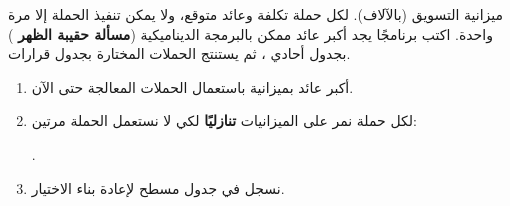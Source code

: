\begin{statement}
ميزانية التسويق  (بالآلاف). لكل حملة تكلفة وعائد متوقع، ولا يمكن تنفيذ الحملة إلا مرة واحدة. اكتب برنامجًا يجد أكبر عائد ممكن بالبرمجة الديناميكية (\textbf{مسألة حقيبة الظهر }) بجدول أحادي ، ثم يستنتج الحملات المختارة بجدول قرارات.
\end{statement}
\begin{stepsbox}\begin{enumerate}
\item {} أكبر عائد بميزانية  باستعمال الحملات المعالجة حتى الآن.
\item لكل حملة نمر على الميزانيات \textbf{تنازليًا} لكي لا نستعمل الحملة مرتين: \par{\centering\small{}\par}.
\item نسجل  في جدول مسطح لإعادة بناء الاختيار.
\end{enumerate}\end{stepsbox}
